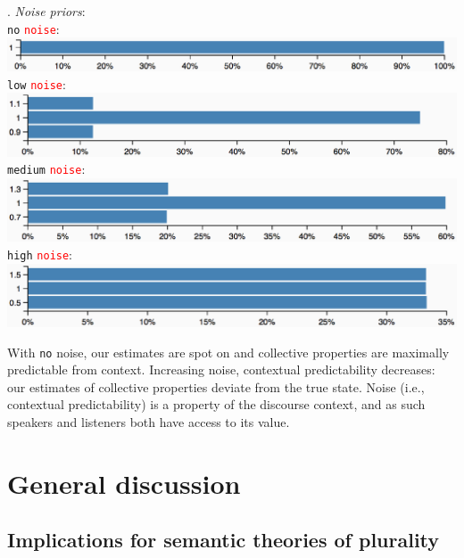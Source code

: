 \documentclass[linguex]{sp}
\begin{document}
\ex. \emph{Noise priors}:\\[5pt]
\texttt{no} \textcolor{red}{\texttt{noise}}:\\[2pt]
\includegraphics[width=\linewidth]{images/no-noise.eps}\\[5pt]
\texttt{low} \textcolor{red}{\texttt{noise}}:\\[2pt]
\includegraphics[width=\linewidth]{images/low-noise.eps}\\[5pt]
\texttt{medium} \textcolor{red}{\texttt{noise}}:\\[2pt]
\includegraphics[width=\linewidth]{images/mid-noise.eps}\\[5pt]
\texttt{high} \textcolor{red}{\texttt{noise}}:\\[2pt]
\includegraphics[width=\linewidth]{images/high-noise.eps}

With \texttt{no} noise, our estimates are spot on and collective properties are maximally predictable from context. Increasing noise, contextual predictability decreases: our estimates of collective properties deviate from the true state. Noise (i.e., contextual predictability) is a property of the discourse context, and as such speakers and listeners both have access to its value.




\section{General discussion}


\subsection{Implications for semantic theories of plurality}
\end{document}
